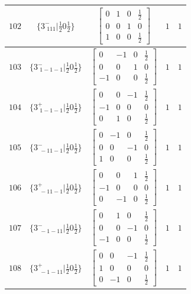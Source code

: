 \documentclass[fleqn,8pt]{jsarticle}
\begin{document}
\begin{longtable}{ccccc}
$ 102 $ & $ \{3^{-}_{\,\,111}|\frac{1}{2} 0 \frac{1}{2}\} $ & $ \begin{bmatrix} 0 & 1 & 0 & \frac{1}{2} \\ 0 & 0 & 1 & 0 \\ 1 & 0 & 0 & \frac{1}{2} \end{bmatrix} $ & $ 1 $ & $ 1 $ \\ \hline
$ 103 $ & $ \{3^{-}_{\,\,1-1-1}|\frac{1}{2} 0 \frac{1}{2}\} $ & $ \begin{bmatrix} 0 & -1 & 0 & \frac{1}{2} \\ 0 & 0 & 1 & 0 \\ -1 & 0 & 0 & \frac{1}{2} \end{bmatrix} $ & $ 1 $ & $ 1 $ \\ \hline
$ 104 $ & $ \{3^{+}_{\,\,1-1-1}|\frac{1}{2} 0 \frac{1}{2}\} $ & $ \begin{bmatrix} 0 & 0 & -1 & \frac{1}{2} \\ -1 & 0 & 0 & 0 \\ 0 & 1 & 0 & \frac{1}{2} \end{bmatrix} $ & $ 1 $ & $ 1 $ \\ \hline
$ 105 $ & $ \{3^{-}_{\,\,-11-1}|\frac{1}{2} 0 \frac{1}{2}\} $ & $ \begin{bmatrix} 0 & -1 & 0 & \frac{1}{2} \\ 0 & 0 & -1 & 0 \\ 1 & 0 & 0 & \frac{1}{2} \end{bmatrix} $ & $ 1 $ & $ 1 $ \\ \hline
$ 106 $ & $ \{3^{+}_{\,\,-11-1}|\frac{1}{2} 0 \frac{1}{2}\} $ & $ \begin{bmatrix} 0 & 0 & 1 & \frac{1}{2} \\ -1 & 0 & 0 & 0 \\ 0 & -1 & 0 & \frac{1}{2} \end{bmatrix} $ & $ 1 $ & $ 1 $ \\ \hline
$ 107 $ & $ \{3^{-}_{\,\,-1-11}|\frac{1}{2} 0 \frac{1}{2}\} $ & $ \begin{bmatrix} 0 & 1 & 0 & \frac{1}{2} \\ 0 & 0 & -1 & 0 \\ -1 & 0 & 0 & \frac{1}{2} \end{bmatrix} $ & $ 1 $ & $ 1 $ \\ \hline
$ 108 $ & $ \{3^{+}_{\,\,-1-11}|\frac{1}{2} 0 \frac{1}{2}\} $ & $ \begin{bmatrix} 0 & 0 & -1 & \frac{1}{2} \\ 1 & 0 & 0 & 0 \\ 0 & -1 & 0 & \frac{1}{2} \end{bmatrix} $ & $ 1 $ & $ 1 $ \\ \hline

\end{longtable}
\end{document}
